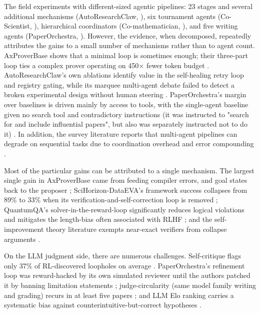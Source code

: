 The field experiments with different-sized agentic pipelines: 23 stages and several additional mechanisms (AutoResearchClaw, \cite{2605.20025}), six tournament agents (Co-Scientist, \cite{Gottweis2026}), hierarchical coordinators (Co-mathematician, \cite{2605.06651}), and five writing agents (PaperOrchestra, \cite{2604.05018}). However, the evidence, when decomposed, repeatedly attributes the gains to a small number of mechanisms rather than to agent count.
AxProverBase shows that a minimal loop is sometimes enough; their three-part loop ties a complex prover operating on 450$\times$ fewer token budget \cite{2602.24273}. AutoResearchClaw's own ablations identify value in the self-healing retry loop and registry gating, while its marquee multi-agent debate failed to detect a broken experimental design without human steering \cite{2605.20025}.
PaperOrchestra's margin over baselines is driven mainly by access to tools, with the single-agent baseline given no search tool and contradictory instructions (it was instructed to "search for and include influential papers", but also was separately instructed not to do it) \cite{2604.05018}. In addition, the survey literature reports that multi-agent pipelines can degrade on sequential tasks due to coordination overhead and error compounding \cite{2512.16301, 2605.18661}.

Most of the particular gains can be attributed to a single mechanism.
The largest single gain in AxProverBase came from feeding compiler errors, and goal states back to the proposer \cite{2602.24273}; SciHorizon-DataEVA's framework success collapses from 89\% to 33\% when its verification-and-self-correction loop is removed \cite{2604.26645}; QuantumQA's solver-in-the-reward-loop significantly reduces logical violations and mitigates the length-bias often
associated with RLHF \cite{2604.18176}; and the self-improvement theory literature exempts near-exact verifiers from collapse arguments \cite{2601.05280}.

On the LLM judgment side, there are numerous challenges. Self-critique flags only 37\% of RL-discovered loopholes on average \cite{2606.04075}. PaperOrchestra's refinement loop was reward-hacked by its own simulated reviewer until the authors patched it by banning limitation statements \cite{2604.05018}; judge-circularity (same model family writing and grading) recurs in at least five papers \cite{2405.17044, 2604.05018, 2604.24658, 2605.20025, Gottweis2026}; and LLM Elo ranking carries a systematic bias against counterintuitive-but-correct hypotheses \cite{2405.17044, Gottweis2026}.

